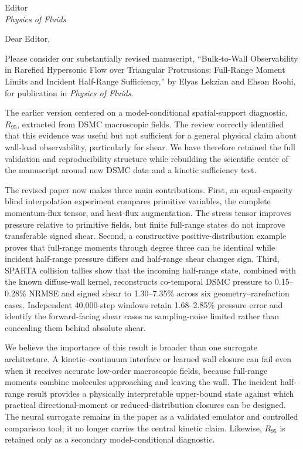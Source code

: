 \documentclass[11pt]{letter}
\date{August 30, 2026}
\begin{document}
\begin{letter}{Editor\\\emph{Physics of Fluids}}
\opening{Dear Editor,}

Please consider our substantially revised manuscript, ``Bulk-to-Wall Observability in Rarefied Hypersonic Flow over Triangular Protrusions: Full-Range Moment Limits and Incident Half-Range Sufficiency,'' by Elyas Lekzian and Ehsan Roohi, for publication in \emph{Physics of Fluids}.

The earlier version centered on a model-conditional spatial-support diagnostic, $R_{95}$, extracted from DSMC macroscopic fields. The review correctly identified that this evidence was useful but not sufficient for a general physical claim about wall-load observability, particularly for shear. We have therefore retained the full validation and reproducibility structure while rebuilding the scientific center of the manuscript around new DSMC data and a kinetic sufficiency test.

The revised paper now makes three main contributions. First, an equal-capacity blind interpolation experiment compares primitive variables, the complete momentum-flux tensor, and heat-flux augmentation. The stress tensor improves pressure relative to primitive fields, but finite full-range states do not improve transferable signed shear. Second, a constructive positive-distribution example proves that full-range moments through degree three can be identical while incident half-range pressure differs and half-range shear changes sign. Third, SPARTA collision tallies show that the incoming half-range state, combined with the known diffuse-wall kernel, reconstructs co-temporal DSMC pressure to 0.15--0.28\% NRMSE and signed shear to 1.30--7.35\% across six geometry--rarefaction cases. Independent 40,000-step windows retain 1.68--2.85\% pressure error and identify the forward-facing shear cases as sampling-noise limited rather than concealing them behind absolute shear.

We believe the importance of this result is broader than one surrogate architecture. A kinetic--continuum interface or learned wall closure can fail even when it receives accurate low-order macroscopic fields, because full-range moments combine molecules approaching and leaving the wall. The incident half-range result provides a physically interpretable upper-bound state against which practical directional-moment or reduced-distribution closures can be designed. The neural surrogate remains in the paper as a validated emulator and controlled comparison tool; it no longer carries the central kinetic claim. Likewise, $R_{95}$ is retained only as a secondary model-conditional diagnostic.


\end{letter}
\end{document}
